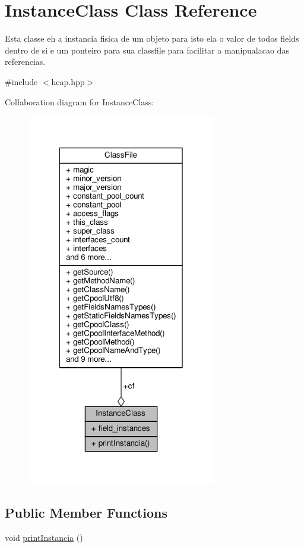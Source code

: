 \hypertarget{classInstanceClass}{\section{Instance\+Class Class Reference}
\label{classInstanceClass}
}


Esta classe eh a instancia fisica de um objeto para isto ela o valor de todos fields dentro de si e um ponteiro para sua classfile para facilitar a manipualacao das referencias.  




{\ttfamily \#include $<$heap.\+hpp$>$}



Collaboration diagram for Instance\+Class\+:
\nopagebreak
\begin{figure}[H]
\begin{center}
\leavevmode
\includegraphics[width=234pt]{classInstanceClass__coll__graph}
\end{center}
\end{figure}
\subsection*{Public Member Functions}
\begin{DoxyCompactItemize}
\item 
void \hyperlink{classInstanceClass_a259f19ffd68296060d27bb351b052022}{print\+Instancia} ()
\end{DoxyCompactItemize}
